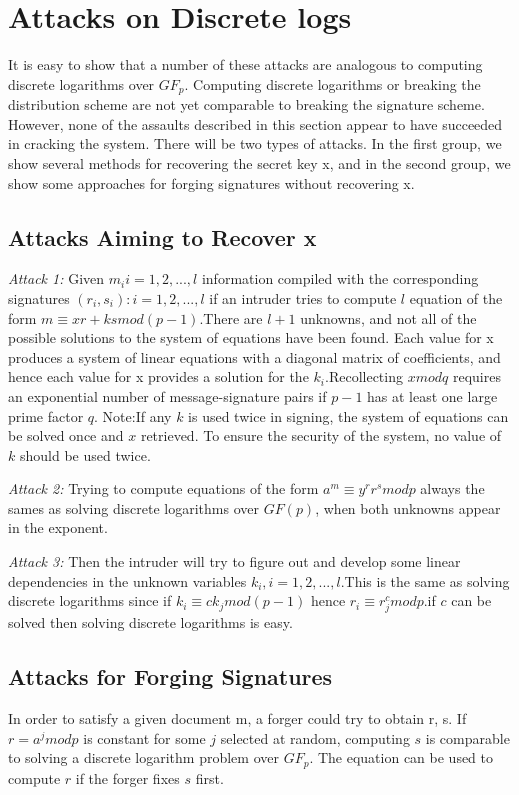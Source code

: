 \section{Attacks on Discrete logs}
It is easy to show that a number of these attacks are analogous to computing discrete logarithms over $GF_{p}$. Computing discrete logarithms or breaking the distribution scheme are not yet comparable to breaking the signature scheme. However, none of the assaults described in this section appear to have succeeded in cracking the system. There will be two types of attacks. In the first group, we show several methods for recovering the secret key x, and in the second group, we show some approaches for forging signatures without recovering x.
\subsection{Attacks Aiming to Recover x}
 \textit{ Attack 1:} Given ${m_{i} i= 1,2,...,l}$ information compiled with the corresponding signatures ${(r_{i},s_{i}): i=1,2,...,l}$ if an intruder tries to compute $l$ equation of the form $ m \equiv xr +ksmod(p-1)$.There are $l+1$ unknowns, and not all of the possible solutions to the system of equations have been found. Each value for x produces a system of linear equations with a diagonal matrix of coefficients, and hence each value for x provides a solution for the $k_{i}$.Recollecting $ x mod q $ requires an exponential number of message-signature pairs if $p -1$ has at least one large prime factor $q$.
Note:If any $k$ is used twice in signing, the system of equations can be solved once and $x$ retrieved. To ensure the security of the system, no value of $k$ should be used twice.

\textit{Attack 2:} Trying to compute equations of the form $a^{m} \equiv y^{r}r^{s}mod p$ always the sames as solving discrete logarithms over $GF(p)$, when both unknowns appear in the exponent.

\textit{ Attack 3:} Then the intruder will try to figure out and develop some linear dependencies in the unknown variables ${ k_{i},i=1,2,...,l}$.This is the same as solving discrete logarithms since if $k_{i} \equiv ck_{j} mod (p-1)$ hence $r_{i} \equiv {r}^{c}_{j} mod p$.if $c$ can be solved then solving discrete logarithms is easy.

\subsection{Attacks for Forging Signatures}
In order to satisfy a given document m, a forger could try to obtain r, s. If $r = a^{j} mod p$ is constant for some $j$ selected at random, computing $s$ is comparable to solving a discrete logarithm problem over $GF_{p}$. The equation can be used to compute $r$ if the forger fixes $s$ first.

